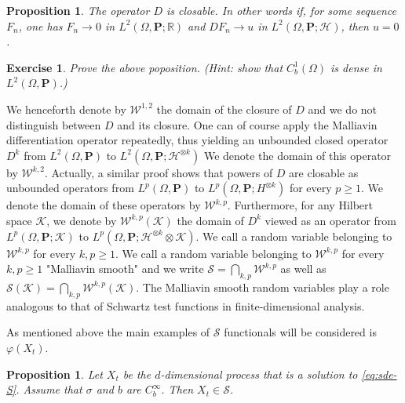 \documentclass[twoside, 12pt]{book}
\numberwithin{equation}{chapter}
\newtheorem{proposition}[theorem]{Proposition}
\newtheorem{exercise}{Exercise}[section]
\def\cH{{\mathcal H}}
\def\cK{{\mathcal K}}
\def\mR{{\mathbb R}}
\def\bP{{\mathbf P}}
\def\sS{{\mathscr S}}
\def\sW{{\mathscr W}}
\def\geq{\geqslant}
\begin{document}
    \begin{proposition}
    	The operator $D$ is closable. In other words if, for some sequence $F_n$, one has $F_n\to 0$ in $L^2(\Omega, \bP;\mR)$ and $DF_n\to u$ in $L^2(\Omega, \bP;\cH)$, then $u=0$.
    \end{proposition}
    \begin{exercise}
    	Prove the above poposition. (Hint: show that $C_b^1(\Omega)$ is dense in $L^2(\Omega,\bP)$.)
    \end{exercise}
    
    We henceforth denote by $\sW^{1,2}$ the domain of the closure of $D$ and we do not distinguish between $D$ and its closure. One can of course apply the Malliavin differentiation operator repeatedly, thus yielding an unbounded closed operator $D^k$ from $L^2(\Omega,\bP)$ to $L^2(\Omega, \bP; \cH^{\otimes k})$ We denote the domain of this operator by $\sW^{k,2}$. Actually, a similar proof shows that powers of $D$ are closable as unbounded operators from $L^p(\Omega, \mathbf{P})$ to $L^p\left(\Omega, \mathbf{P}; H^{\otimes k}\right)$ for every $p \geq 1$. We denote the domain of these operators by $\mathscr{W}^{k, p}$. Furthermore, for any Hilbert space $\cK$, we denote by $\mathscr{W}^{k, p}(\cK)$ the domain of $D^k$ viewed as an operator from $L^p(\Omega, \mathbf{P}; \cK)$ to $L^p\left(\Omega, \mathbf{P}; \cH^{\otimes k} \otimes \cK\right)$. We call a random variable belonging to $\mathscr{W}^{k, p}$ for every $k, p \geq 1$. We call a random variable belonging to $\mathscr{W}^{k, p}$ for every $k, p \geq 1$ "Malliavin smooth" and we write $\sS=\bigcap_{k, p} \mathscr{W}^{k, p}$ as well as $\sS(\cK)=\bigcap_{k, p} \mathscr{W}^{k, p}(\cK)$. The Malliavin smooth random variables play a role analogous to that of Schwartz test functions in finite-dimensional analysis.
    
   As mentioned above the main examples of $\sS$ functionals will be considered is $\varphi(X_t)$.
   \begin{proposition}
   	Let  $X_t$ be the $d$-dimensional process that is a solution to \eqref{eq:sde-S}. Assume that $\sigma$ and $b$ are $C^{\infty}_b$. Then $X_t \in \sS$.   
   \end{proposition}
   
\end{document}
